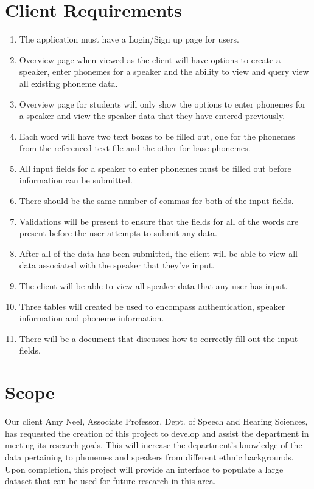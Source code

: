 \documentclass[12pt, a4paper, oneside]{article}
\begin{document}
\section*{Client Requirements}
\begin{enumerate}
\item The application must have a Login/Sign up page for users.

\item Overview page when viewed as the client will have options to create a speaker, enter phonemes for a speaker and the ability to view and query view all existing phoneme data.

\item Overview page for students will only show the options to enter phonemes for a speaker and view the speaker data that they have entered previously.

\item Each word will have two text boxes to be filled out, one for the phonemes from the referenced text file and the other for base phonemes.

\item All input fields for a speaker to enter phonemes must be filled out before information can be submitted. 

\item There should be the same number of commas for both of the input fields.

\item Validations will be present to ensure that the fields for all of the words are present before the user attempts to submit any data. 

\item After all of the data has been submitted, the client will be able to view all data associated with the speaker that they’ve input.

\item The client will be able to view all speaker data that any user has input.

\item Three tables will created be used to encompass authentication, speaker information and phoneme information.

\item There will be a document that discusses how to correctly fill out the input fields.
\end{enumerate}

\section*{Scope}
Our client Amy Neel, Associate Professor, Dept. of Speech and Hearing Sciences, has requested the creation of this project to develop and assist the department in meeting its research goals. This will increase the department’s knowledge of the data pertaining to phonemes and speakers from different ethnic backgrounds. Upon completion, this project will provide an interface to populate a large dataset that can be used for future research in this area. \\
\end{document}
